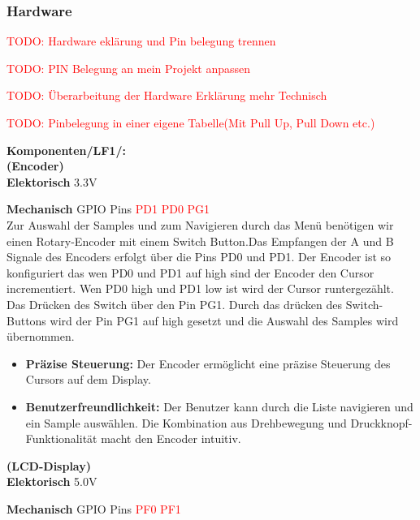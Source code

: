 \subsubsection{Hardware}

\textcolor{red}{TODO: Hardware eklärung und Pin belegung trennen}

\textcolor{red}{TODO: PIN Belegung an mein Projekt anpassen}

\textcolor{red}{TODO: Überarbeitung der Hardware Erklärung mehr Technisch}

\textcolor{red}{TODO: Pinbelegung in einer eigene Tabelle(Mit Pull Up, Pull Down etc.)}

\textbf{Komponenten/LF1/:} \\


\textbf{(Encoder)} \\

\textbf{Elektorisch} 3.3V

\textbf{Mechanisch} GPIO Pins \textcolor{red}{PD1 PD0 PG1}
\\

Zur Auswahl der Samples und zum Navigieren durch das Menü benötigen wir einen Rotary-Encoder mit einem Switch Button.Das Empfangen der A und B Signale des Encoders erfolgt über die Pins PD0 und PD1. Der Encoder ist so konfiguriert das wen PD0 und PD1 auf high sind der Encoder den Cursor incrementiert. Wen PD0 high und PD1 low ist wird der Cursor runtergezählt.
Das Drücken des Switch über den Pin PG1. Durch das drücken des Switch-Buttons wird der Pin PG1 auf high gesetzt und die Auswahl des Samples wird übernommen.

\begin{itemize}
	\item \textbf{Präzise Steuerung:} Der Encoder ermöglicht eine präzise Steuerung des Cursors auf dem Display.
	
	\item \textbf{Benutzerfreundlichkeit:} Der Benutzer kann durch die Liste navigieren und ein Sample auswählen. Die Kombination aus Drehbewegung und Druckknopf-Funktionalität macht den Encoder intuitiv.  
\end{itemize}





\textbf{(LCD-Display)} \\

\textbf{Elektorisch} 5.0V

\textbf{Mechanisch} GPIO Pins  \textcolor{red}{PF0 PF1} \\


